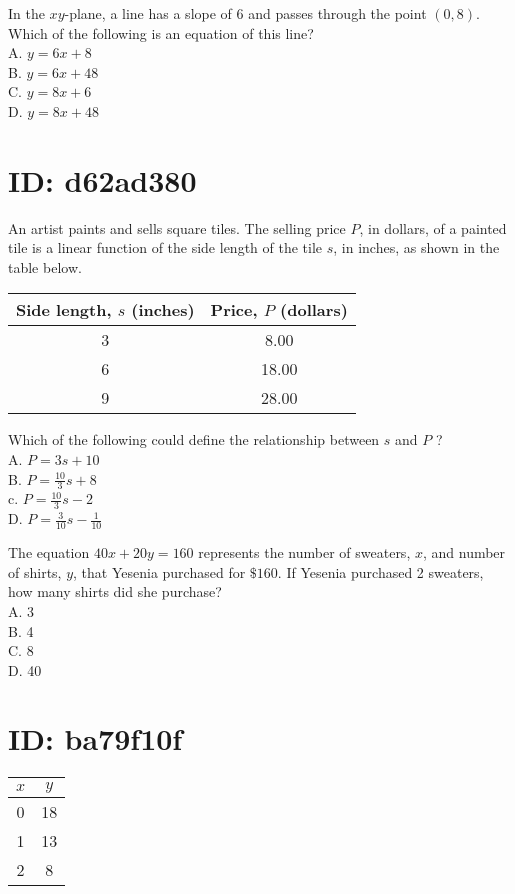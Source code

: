 In the $x y$-plane, a line has a slope of 6 and passes through the point $(0,8)$. Which of the following is an equation of this line?\\
A. $y=6 x+8$\\
B. $y=6 x+48$\\
C. $y=8 x+6$\\
D. $y=8 x+48$

\section*{ID: d62ad380}
An artist paints and sells square tiles. The selling price $P$, in dollars, of a painted tile is a linear function of the side length of the tile $s$, in inches, as shown in the table below.

\begin{center}
\begin{tabular}{|c|c|}
\hline
Side length, $s$ (inches) & Price, $P$ (dollars) \\
\hline
3 & 8.00 \\
\hline
6 & 18.00 \\
\hline
9 & 28.00 \\
\hline
\end{tabular}
\end{center}

Which of the following could define the relationship between $s$ and $P$ ?\\
A. $P=3 s+10$\\
B. $P=\frac{10}{3} s+8$\\
c. $P=\frac{10}{3} s-2$\\
D. $P=\frac{3}{10} s-\frac{1}{10}$

The equation $40 x+20 y=160$ represents the number of sweaters, $x$, and number of shirts, $y$, that Yesenia purchased for $\$ 160$. If Yesenia purchased 2 sweaters, how many shirts did she purchase?\\
A. 3\\
B. 4\\
C. 8\\
D. 40

\section*{ID: ba79f10f}
\begin{center}
\begin{tabular}{|c|c|}
\hline
$x$ & $y$ \\
\hline
0 & 18 \\
\hline
1 & 13 \\
\hline
2 & 8 \\
\hline
\end{tabular}
\end{center}

